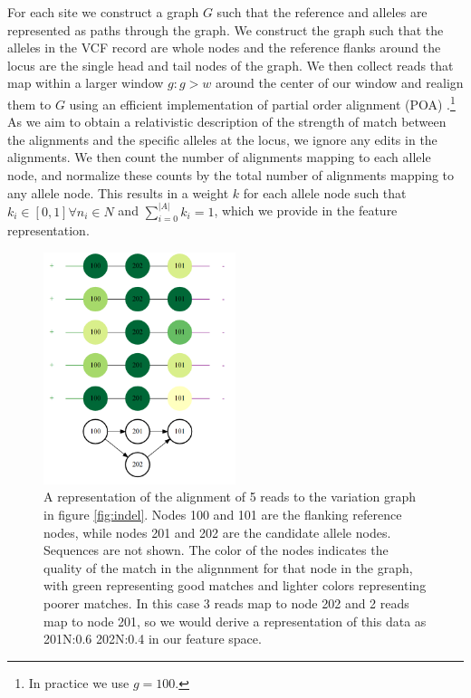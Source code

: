 \documentclass{article}
\begin{document}
For each site we construct a graph $G$ such that the reference and alleles are represented as paths through the graph.
We construct the graph such that the alleles in the VCF record are whole nodes and the reference flanks around the locus are the single head and tail nodes of the graph.
We then collect reads that map within a larger window $g : g > w$ around the center of our window and realign them to $G$ using an efficient implementation of partial order alignment (POA) \cite{lee2002POA}.\footnote{In practice we use $g = 100$.}
As we aim to obtain a relativistic description of the strength of match between the alignments and the specific alleles at the locus, we ignore any edits in the alignments.
We then count the number of alignments mapping to each allele node, and normalize these counts by the total number of alignments mapping to any allele node.
This results in a weight $k$ for each allele node such that $k_i \in [0, 1] \forall n_i \in N$ and $\sum_{i = 0}^{|A|} k_i = 1$, which we provide in the feature representation.

\begin{figure}[t]
\centering
\includegraphics[width=0.5\textwidth]{graphaln}
\caption{\label{fig:graphaln}
  A representation of the alignment of 5 reads to the variation graph in figure \ref{fig:indel}.
  Nodes 100 and 101 are the flanking reference nodes, while nodes 201 and 202 are the candidate allele nodes.
  Sequences are not shown.
  The color of the nodes indicates the quality of the match in the alignnment for that node in the graph, with green representing good matches and lighter colors representing poorer matches.
  In this case 3 reads map to node 202 and 2 reads map to node 201, so we would derive a representation of this data as 201N:0.6 202N:0.4 in our feature space.
}
\end{figure}
\end{document}

